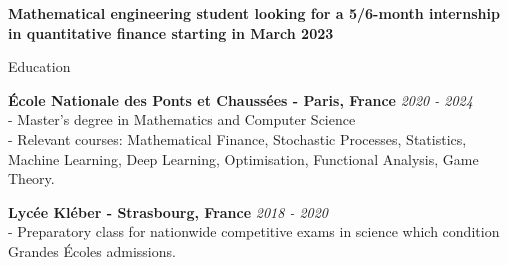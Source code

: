 \documentclass{resume} %
\begin{document}
\begin{center}
    \textbf{\Large{Mathematical engineering student looking for a 5/6-month internship in quantitative finance starting in March 2023}}
\end{center}





\begin{rSection}{Education}

{\bf \'Ecole Nationale des Ponts et Chaussées - Paris, France} \hfill {\em 2020 - 2024} 
\\- Master's degree in Mathematics and Computer Science \hfill 
\\- Relevant courses: Mathematical Finance, Stochastic Processes, Statistics, Machine Learning, Deep Learning, Optimisation, Functional Analysis, Game Theory.

{\bf Lycée Kléber - Strasbourg, France} \hfill {\em 2018 - 2020} 
\\- Preparatory class for nationwide competitive exams in science which condition Grandes \'Ecoles admissions. \hfill 


\end{rSection}

\end{document}

